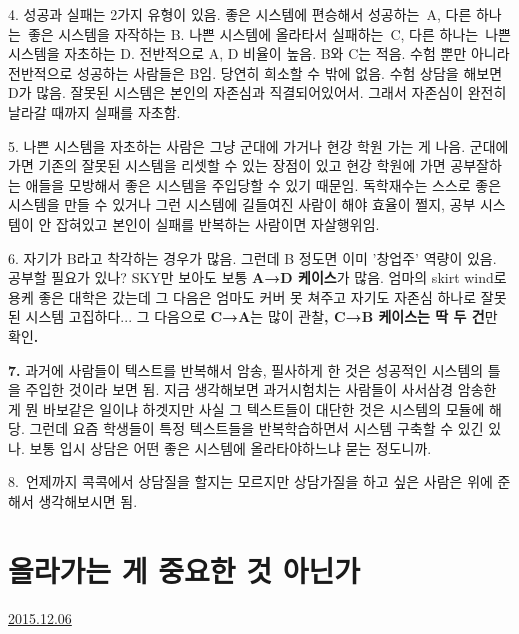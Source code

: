 \item 4. 성공과 실패는 2가지 유형이 있음.
좋은 시스템에 편승해서 성공하는 A, 다른 하나는 좋은 시스템을 자작하는 B.
나쁜 시스템에 올라타서 실패하는 C, 다른 하나는 나쁜 시스템을 자초하는 D.
전반적으로 A, D 비율이 높음. B와 C는 적음.
수험 뿐만 아니라 전반적으로 성공하는 사람들은 B임. 당연히 희소할 수 밖에 없음.
수험 상담을 해보면 D가 많음.
잘못된 시스템은 본인의 자존심과 직결되어있어서.
그래서 자존심이 완전히 날라갈 때까지 실패를 자초함.
\vspace{5mm}

\item 5. 나쁜 시스템을 자초하는 사람은 그냥 군대에 가거나 현강 학원 가는 게 나음.
군대에 가면 기존의 잘못된 시스템을 리셋할 수 있는 장점이 있고
현강 학원에 가면 공부잘하는 애들을 모방해서 좋은 시스템을 주입당할 수 있기 때문임.
독학재수는 스스로 좋은 시스템을 만들 수 있거나 그런 시스템에 길들여진 사람이 해야 효율이 쩔지,
공부 시스템이 안 잡혀있고 본인이 실패를 반복하는 사람이면 자살행위임.
\vspace{5mm}

\item 6. 자기가 B라고 착각하는 경우가 많음. 그런데 B 정도면 이미 '창업주' 역량이 있음. 공부할 필요가 있나?
SKY만 보아도 보통 \textbf{A→D 케이스}가 많음.
엄마의 skirt wind로 용케 좋은 대학은 갔는데 그 다음은 엄마도 커버 못 쳐주고 자기도 자존심 하나로 잘못된 시스템 고집하다...
그 다음으로 \textbf{C→A}는 많이 관찰\textbf{, C→B 케이스는 딱 두 건}만 확인\textbf{.}
\vspace{5mm}

\textbf{7.} 과거에 사람들이 텍스트를 반복해서 암송, 필사하게 한 것은 성공적인 시스템의 틀을 주입한 것이라 보면 됨.
지금 생각해보면 과거시험치는 사람들이 사서삼경 암송한 게 뭔 바보같은 일이냐 하겟지만
사실 그 텍스트들이 대단한 것은 시스템의 모듈에 해당.
그런데 요즘 학생들이 특정 텍스트들을 반복학습하면서 시스템 구축할 수 있긴 있나.
보통 입시 상담은 어떤 좋은 시스템에 올라타야하느냐 묻는 정도니까.
\vspace{5mm}

8. 언제까지 콕콕에서 상담질을 할지는 모르지만 상담가질을 하고 싶은 사람은 위에 준해서 생각해보시면 됨.
\vspace{5mm}



\section{올라가는 게 중요한 것 아닌가}
\href{https://www.kockoc.com/Apoc/529739}{2015.12.06}

